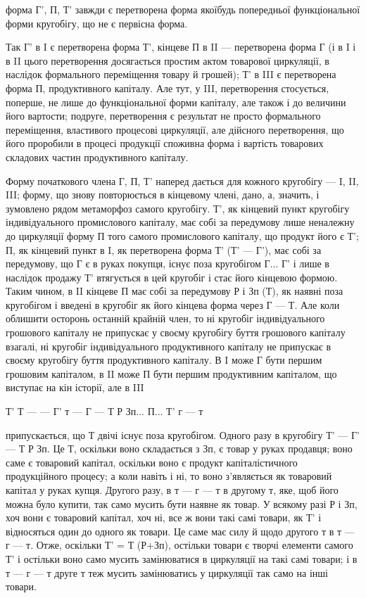 \parcont{}  %
форма Г', П, Т' завжди є перетворена форма якоїбудь попередньої функціональної форми кругобігу, що
не є первісна форма.

Так Г' в I є перетворена форма Т', кінцеве П в II — перетворена форма Г (і в I і в II цього
перетворення досягається простим актом товарової циркуляції, в наслідок формального переміщення
товару й грошей); Т' в III є перетворена форма П, продуктивного капіталу. Але тут, у III,
перетворення стосується, поперше, не лише до функціональної форми капіталу, але також і до величини
його вартости; подруге, перетворення є результат не просто формального переміщення, властивого
процесові циркуляції, але дійсного перетворення, що його проробили в процесі продукції споживна
форма і вартість товарових складових частин продуктивного капіталу.

Форму початкового члена Г, П, Т' наперед дається для кожного кругобігу — I, II, III; форму, що знову
повторюється в кінцевому члені, дано, а, значить, і зумовлено рядом метаморфоз самого кругобігу. Т',
як кінцевий пункт кругобігу індивідуального промислового капіталу, має собі за передумову лише
неналежну до циркуляції форму П того самого промислового капіталу, що продукт його є Т'; П, як
кінцевий пункт в I, як перетворена форма Т' (Т' — Г'), має собі за передумову, що Г є в руках
покупця, існує поза кругобігом Г... Г' і лише в наслідок продажу Т' втягується в цей кругобіг і стає
його кінцевою формою. Таким чином, в II кінцеве П має собі за передумову Р і Зп (Т), як наявні поза
кругобігом і введені в кругобіг як його кінцева форма через Г — Т. Але коли облишити осторонь
останній крайній член, то ні кругобіг індивідуального грошового капіталу не припускає у своєму
кругобігу буття грошового капіталу взагалі, ні кругобіг індивідуального
продуктивного капіталу не припускає в своєму кругобігу буття продуктивного капіталу. В I може Г бути
першим грошовим капіталом, в II може П бути першим продуктивним капіталом, що виступає на кін
історії, але в III

Т' Т — — Г' т — Г — Т Р Зп... П... Т' г — т

припускається, що Т двічі існує поза кругобігом. Одного разу в кругобігу Т' — Г' — Т Р Зп. Це Т,
оскільки воно складається з Зп, є товар у руках продавця; воно саме є товаровий капітал, оскільки
воно є продукт капіталістичного продукційного процесу; а коли навіть і ні, то воно з’являється як
товаровий капітал у руках купця. Другого разу, в т — г — т в другому т, яке, щоб його можна було
купити, так само мусить бути наявне як товар. У всякому разі Р і Зп, хоч вони є товаровий
капітал, хоч ні, все ж вони такі самі товари, як Т' і відносяться один до одного як товари. Це
саме має силу й щодо другого т в т — г — т. Отже, оскільки Т' = Т (Р+Зп), остільки товари є творчі
елементи самого Т' і остільки воно само мусить замінюватися в циркуляції на такі самі товари; і в т
— г — т друге т теж мусить замінюватись у циркуляції так само на інші товари.

